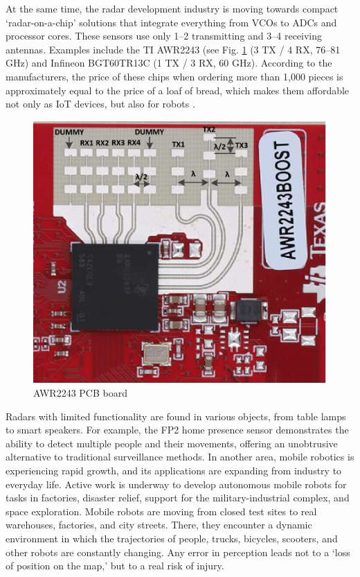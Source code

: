 \noindent
At the same time, the radar development industry is moving towards compact ‘radar-on-a-chip’ solutions that integrate everything from VCOs to ADCs and processor cores. These sensors use only 1–2 transmitting and 3–4 receiving antennas. Examples include the TI AWR2243 (see Fig. \ref{fig:AWR2243} (3 TX / 4 RX, 76–81 GHz) and Infineon BGT60TR13C (1 TX / 3 RX, 60 GHz). According to the manufacturers, the price of these chips when ordering more than 1,000 pieces is approximately equal to the price of a loaf of bread, which makes them affordable not only as IoT devices, but also for robots \citep{ti_awr2243_datasheet} \citep{ti_mmwave_overview} \citep{infineon_bgt60tr13c}.


\begin{figure}
    \centering
    \includegraphics[width=0.3\linewidth]{Src/images/AWR2243.png}
    \caption{AWR2243 PCB board}
    \label{fig:AWR2243}
\end{figure}


Radars with limited functionality are found in various objects, from table lamps to smart speakers. For example, the FP2 home presence sensor \cite{Aqara_Presence_Sensor_FP2} demonstrates the ability to detect multiple people and their movements, offering an unobtrusive alternative to traditional surveillance methods.
In another area, mobile robotics is experiencing rapid growth, and its applications are expanding from industry to everyday life. Active work is underway to develop autonomous mobile robots for tasks in factories, disaster relief, support for the military-industrial complex, and space exploration.
Mobile robots are moving from closed test sites to real warehouses, factories, and city streets. There, they encounter a dynamic environment in which the trajectories of people, trucks, bicycles, scooters, and other robots are constantly changing. Any error in perception leads not to a ‘loss of position on the map,’ but to a real risk of injury.

